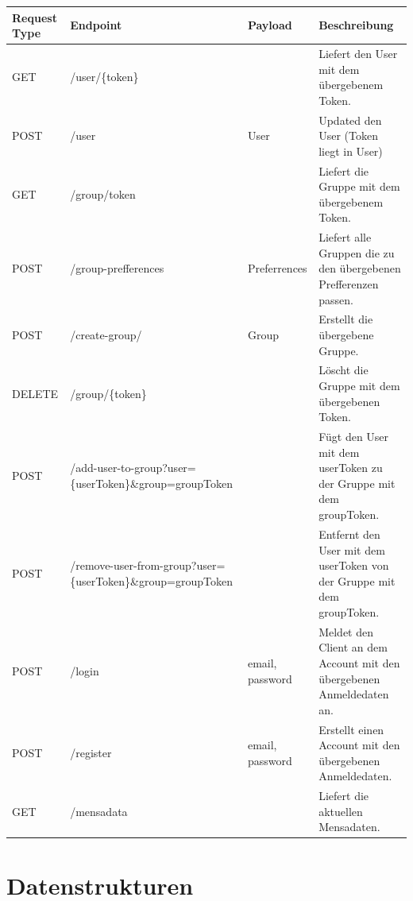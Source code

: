 \documentclass[a4paper]{scrreprt}
\begin{document}
\resizebox{16cm}{!} {
\begin{tabu} { | l | l | l | l | } 
 \hline
 Request Type & Endpoint & Payload & Beschreibung \\ [0.5ex] 
 \hline
 GET  & /user/\{token\} &  & Liefert den User mit dem übergebenem Token. \\ 
 
 POST & /user  & User & Updated den User (Token liegt in User) \\ 
 \hline
GET & /group/{token} & & Liefert die Gruppe mit dem übergebenem Token. \\
POST & /group-prefferences & Preferrences & Liefert alle Gruppen die zu den übergebenen Prefferenzen passen. \\
POST  & /create-group/  & Group & Erstellt die übergebene Gruppe. \\
DELETE  & /group/\{token\} & & Löscht die Gruppe mit dem übergebenen Token. \\

\hline 

POST  & /add-user-to-group?user=\{userToken\}\&group={groupToken} & & Fügt den User mit dem userToken zu der Gruppe mit dem groupToken. \\
POST  & /remove-user-from-group?user=\{userToken\}\&group={groupToken} & & Entfernt den User mit dem userToken von der Gruppe mit dem groupToken. \\

\hline

POST & /login & email, password & Meldet den Client an dem Account mit den übergebenen Anmeldedaten an. \\
POST & /register & email, password & Erstellt einen Account mit den übergebenen Anmeldedaten. \\

\hline

GET &  /mensadata & & Liefert die aktuellen Mensadaten.\\

\hline

\end{tabu}
}




\chapter{Datenstrukturen}
\end{document}
